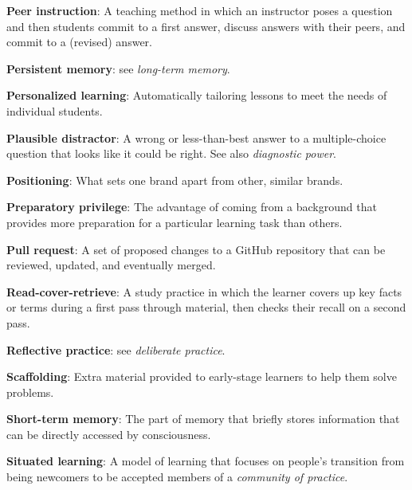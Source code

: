 \textbf{\hypertarget{g:peer-instruction}{Peer instruction}\label{g:peer-instruction}}: A teaching method in
which an instructor poses a question and then students commit to a first
answer, discuss answers with their peers, and commit to a (revised)
answer.

\textbf{\hypertarget{g:persistent-memory}{Persistent memory}\label{g:persistent-memory}}: see \emph{long-term
memory}.

\textbf{\hypertarget{g:personalized-learning}{Personalized learning}\label{g:personalized-learning}}:
Automatically tailoring lessons to meet the needs of individual
students.

\textbf{\hypertarget{g:plausible-distractor}{Plausible distractor}\label{g:plausible-distractor}}: A wrong or
less-than-best answer to a multiple-choice question that looks like it
could be right. See also \emph{diagnostic power}.

\textbf{\hypertarget{g:positioning}{Positioning}\label{g:positioning}}: What sets one brand apart from
other, similar brands.

\textbf{\hypertarget{g:preparatory-privilege}{Preparatory privilege}\label{g:preparatory-privilege}}: The
advantage of coming from a background that provides more preparation for
a particular learning task than others.

\textbf{\hypertarget{g:pull-request}{Pull request}\label{g:pull-request}}: A set of proposed changes to
a GitHub repository that can be reviewed, updated, and eventually
merged.

\textbf{\hypertarget{g:read-cover-retrieve}{Read-cover-retrieve}\label{g:read-cover-retrieve}}: A study
practice in which the learner covers up key facts or terms during a
first pass through material, then checks their recall on a second pass.

\textbf{\hypertarget{g:reflective-practice}{Reflective practice}\label{g:reflective-practice}}: see \emph{deliberate
practice}.

\textbf{\hypertarget{g:scaffolding}{Scaffolding}\label{g:scaffolding}}: Extra material provided to
early-stage learners to help them solve problems.

\textbf{\hypertarget{g:short-term-memory}{Short-term memory}\label{g:short-term-memory}}: The part of memory
that briefly stores information that can be directly accessed by
consciousness.

\textbf{\hypertarget{g:situated-learning}{Situated learning}\label{g:situated-learning}}: A model of learning
that focuses on people's transition from being newcomers to be accepted
members of a \emph{community of practice}.

